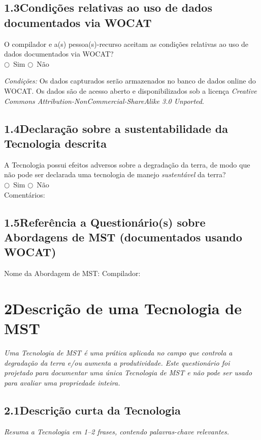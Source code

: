 \subsection{1.3\quad Condições relativas ao uso de dados documentados via WOCAT}

O compilador e a(s) pessoa(s)-recurso aceitam as condições relativas ao uso de dados documentados via WOCAT?\\
$\bigcirc$~Sim \qquad $\bigcirc$~Não

\medskip\noindent\textit{Condições:} Os dados capturados serão armazenados no banco de dados online do WOCAT. Os dados são de acesso aberto e disponibilizados sob a licença \textit{Creative Commons Attribution-NonCommercial-ShareAlike 3.0 Unported}.

\subsection{1.4\quad Declaração sobre a sustentabilidade da Tecnologia descrita}

A Tecnologia possui efeitos adversos sobre a degradação da terra, de modo que não pode ser declarada uma tecnologia de manejo \textit{sustentável} da terra?\\
$\bigcirc$~Sim \qquad $\bigcirc$~Não\\
Comentários: \dotfill

\subsection{1.5\quad Referência a Questionário(s) sobre Abordagens de MST (documentados usando WOCAT)}

Nome da Abordagem de MST: \dotfill\quad Compilador: \dotfill

\section{2\quad Descrição de uma Tecnologia de MST}

\textit{Uma Tecnologia de MST é uma prática aplicada no campo que controla a degradação da terra e/ou aumenta a produtividade. Este questionário foi projetado para documentar uma única Tecnologia de MST e não pode ser usado para avaliar uma propriedade inteira.}

\subsection{2.1\quad Descrição curta da Tecnologia}
\textit{Resuma a Tecnologia em 1--2 frases, contendo palavras-chave relevantes.}\\[4pt]
\dotfill\\[2pt]\dotfill

